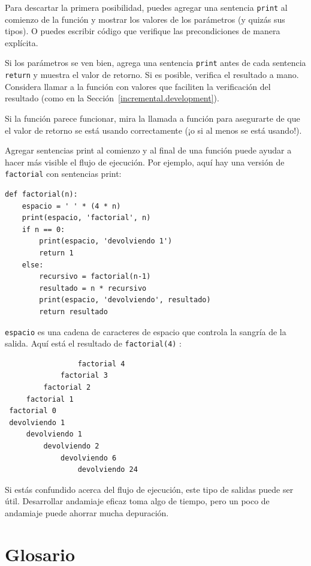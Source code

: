 \documentclass[10pt]{book}
\begin{document}
Para descartar la primera posibilidad, puedes agregar una sentencia {\tt print}
al comienzo de la función y mostrar los valores de los
parámetros (y quizás sus tipos).  O puedes escribir código
que verifique las precondiciones de manera explícita.

Si los parámetros se ven bien, agrega una sentencia {\tt print} antes de cada
sentencia {\tt return} y muestra el valor de retorno.  Si es
posible, verifica el resultado a mano.  Considera llamar a la
función con valores que faciliten la verificación del resultado
(como en la Sección~\ref{incremental.development}).

Si la función parece funcionar, mira la llamada a función
para asegurarte de que el valor de retorno se está usando correctamente (¡o si al
menos se está usando!).

Agregar sentencias print al comienzo y al final de una función
puede ayudar a hacer más visible el flujo de ejecución.
Por ejemplo, aquí hay una versión de {\tt factorial} con
sentencias print:

\begin{verbatim}
def factorial(n):
    espacio = ' ' * (4 * n)
    print(espacio, 'factorial', n)
    if n == 0:
        print(espacio, 'devolviendo 1')
        return 1
    else:
        recursivo = factorial(n-1)
        resultado = n * recursivo
        print(espacio, 'devolviendo', resultado)
        return resultado
\end{verbatim}
%
{\tt espacio} es una cadena de caracteres de espacio que controla la
sangría de la salida.  Aquí está el resultado de {\tt factorial(4)} :

\begin{verbatim}
                 factorial 4
             factorial 3
         factorial 2
     factorial 1
 factorial 0
 devolviendo 1
     devolviendo 1
         devolviendo 2
             devolviendo 6
                 devolviendo 24
\end{verbatim}
%
Si estás confundido acerca del flujo de ejecución, este tipo de
salidas puede ser útil.  Desarrollar andamiaje eficaz toma algo de
tiempo, pero un poco de andamiaje puede ahorrar mucha depuración.


\section{Glosario}
\end{document}

